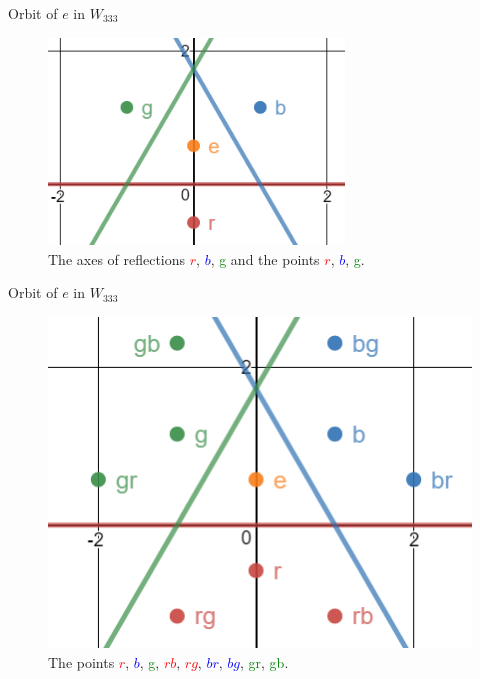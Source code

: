 \documentclass[usenames,dvipsnames]{beamer}
\begin{document}
\begin{frame}{Orbit of $e$ in $W_{333}$}

\begin{figure}[h]
    \centering
    \includegraphics[width=0.7\textwidth]{images/6-01-rbg-rbg-1.png}
    \caption{The axes of reflections \textcolor{red}{$r$}, \textcolor{blue}{$b$}, \textcolor{green}{g} and the points \textcolor{red}{$r$}, \textcolor{blue}{$b$}, \textcolor{green}{g}.}
\end{figure}

\end{frame}

\begin{frame}{Orbit of $e$ in $W_{333}$}

\begin{figure}[h]
    \centering
    \includegraphics[width=.65\textwidth]{images/6-02-rbg_rbg_2.png}
    \caption{The points \textcolor{red}{$r$}, \textcolor{blue}{$b$}, \textcolor{green}{g}, \textcolor{red}{$rb$}, \textcolor{red}{$rg$}, \textcolor{blue}{$br$}, \textcolor{blue}{$bg$}, \textcolor{green}{gr}, \textcolor{green}{gb}.}
\end{figure}

\end{frame}
\end{document}
